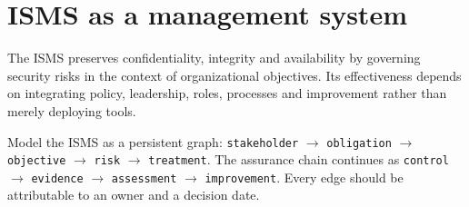 \documentclass[11pt,letterpaper]{article}
\begin{document}
\section{ISMS as a management system}
\SourceTag The ISMS preserves confidentiality, integrity and availability by governing security risks in the context of organizational objectives. Its effectiveness depends on integrating policy, leadership, roles, processes and improvement rather than merely deploying tools.

\EngineeringTag Model the ISMS as a persistent graph: \texttt{stakeholder} $\rightarrow$ \texttt{obligation} $\rightarrow$ \texttt{objective} $\rightarrow$ \texttt{risk} $\rightarrow$ \texttt{treatment}. The assurance chain continues as \texttt{control} $\rightarrow$ \texttt{evidence} $\rightarrow$ \texttt{assessment} $\rightarrow$ \texttt{improvement}. Every edge should be attributable to an owner and a decision date.
\begin{center}\end{center}
\end{document}
